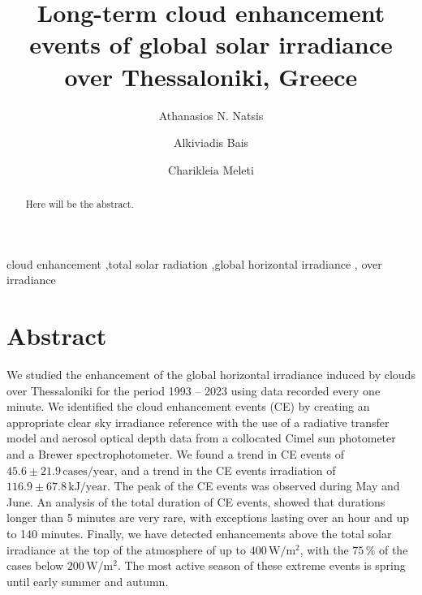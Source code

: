 \documentclass[preprint, 5p,
authoryear]{elsarticle} %
\begin{document}
\begin{frontmatter}

  \title{Long-term cloud enhancement events of global solar irradiance
over Thessaloniki, Greece}
    \author[LAP]{Athanasios N. Natsis%
  }
    \author[LAP]{Alkiviadis Bais%
  }
    \author[LAP]{Charikleia Meleti%
  }
  
  \begin{abstract}
  Here will be the abstract.
  \end{abstract}
    \begin{keyword}
    cloud enhancement \sep total solar radiation \sep global horizontal
irradiance \sep 
    over irradiance
  \end{keyword}
  
 \end{frontmatter}

\section*{Abstract}\label{abstract}

We studied the enhancement of the global horizontal irradiance induced
by clouds over Thessaloniki for the period 1993 -- 2023 using data
recorded every one minute. We identified the cloud enhancement events
(CE) by creating an appropriate clear sky irradiance reference with the
use of a radiative transfer model and aerosol optical depth data from a
collocated Cimel sun photometer and a Brewer spectrophotometer. We found
a trend in CE events of \(45.6\pm
21.9\,\text{cases}/\text{year}\), and a trend in the CE events
irradiation of \(116.9\pm
67.8\,\text{kJ}/\text{year}\). The peak of the CE events was observed
during May and June. An analysis of the total duration of CE events,
showed that durations longer than 5 minutes are very rare, with
exceptions lasting over an hour and up to 140 minutes. Finally, we have
detected enhancements above the total solar irradiance at the top of the
atmosphere of up to \(400\,\text{W}/\text{m}^{2}\), with the \(75\,\%\)
of the cases below \(200\,\text{W}/\text{m}^{2}\). The most active
season of these extreme events is spring until early summer and autumn.
\end{document}
